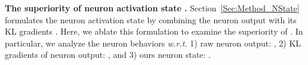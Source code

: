 \documentclass{article} \usepackage{iclr2024_conference,times}
\newcommand{\bfstart}[1]{\noindent\textbf{#1.}}
\begin{document}
\vspace{2mm}
\begin{table*}[!hb]
	\centering
	\vspace{-1.5mm}
	\caption{Performance of \texttt{NAC-UE} with different layer choices. }
	\label{table:OOD_Layer}
\end{table*}
\vspace{1.5mm}


















\bfstart{The superiority of neuron activation state } Section~\ref{Sec:Method_NState} formulates the neuron activation state  by combining the neuron output  with its KL gradients . Here, we ablate this formulation to examine the superiority of . 
In particular, we analyze the neuron behaviors \textit{w.r.t.} 1) raw neuron output: , 2) KL gradients of neuron output: , and 3) ours neuron state: . 
\end{document}
